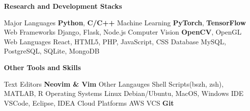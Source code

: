 
\vspace{-1em}
\begin{multicols}{2}
\textbf{Research and Development Stacks}
\vspace{-1em}
\begin{cvskills}
\cvskill
{Major Languages}
{\textbf{Python}, \textbf{C/C++}}
\cvskill
{Machine Learning}
{\textbf{PyTorch}, \textbf{TensorFlow}}
\cvskill
{Web Frameworks}
{Django, Flask, Node.js}
\cvskill
{Computer Vision}
{\textbf{OpenCV}, OpenGL}
\cvskill
{Web Languages} %
{React, HTML5, PHP, JavaScript, CSS} %
\cvskill
{Database}
{MySQL, PostgreSQL, SQLite, MongoDB}
\end{cvskills}

\textbf{Other Tools and Skills}
\vspace{-1em}
\begin{cvskills}
  \cvskill
    {Text Editors}
    {\textbf{Neovim \& Vim}}
  \cvskill
    {Other Langauges} %
    {Shell Scripts(bszh, zsh), MATLAB, R} %
  \cvskill
    {Operating Systems} %
    {Linux Debian/Ubuntu, MacOS, Windows}
  \cvskill
    {IDE} %
    {VSCode, Eclipse, IDEA} %
  \cvskill
    {Cloud Platforms} %
    {AWS} %
  \cvskill
    {VCS}
    {\textbf{Git}} %
\end{cvskills}

\end{multicols}
\vspace{-0.5em}
